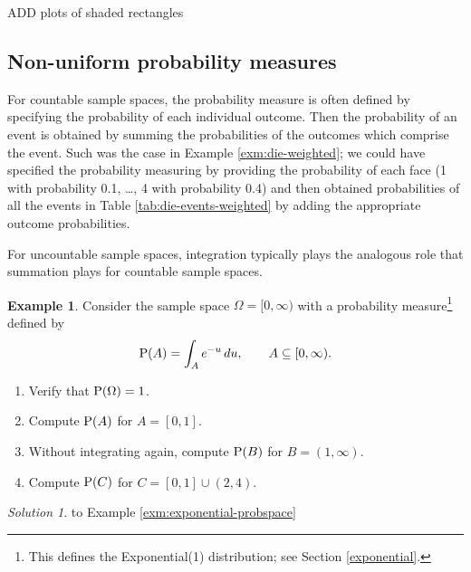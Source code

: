 \documentclass[
]{book}
\providecommand{\tightlist}{%
  \setlength{\itemsep}{0pt}\setlength{\parskip}{0pt}}
\theoremstyle{definition}
\theoremstyle{definition}
\newtheorem{example}{Example}[chapter]
\theoremstyle{definition}
\theoremstyle{remark}
\newtheorem*{solution}{Solution}
\begin{document}
ADD plots of shaded rectangles

\hypertarget{non-uniform-probability-measures}{%
\subsection{Non-uniform probability measures}\label{non-uniform-probability-measures}}

For countable sample spaces, the probability measure is often defined by specifying the probability of each individual outcome. Then the probability of an event is obtained by summing the probabilities of the outcomes which comprise the event. Such was the case in Example \ref{exm:die-weighted}; we could have specified the probability measuring by providing the probability of each face (1 with probability 0.1, \ldots, 4 with probability 0.4) and then obtained probabilities of all the events in Table \ref{tab:die-events-weighted} by adding the appropriate outcome probabilities.

For uncountable sample spaces, integration typically plays the analogous role that summation plays for countable sample spaces.

\begin{example}
\protect\hypertarget{exm:exponential-probspace}{}{\label{exm:exponential-probspace} }Consider the sample space \(\Omega=[0,\infty)\) with a probability measure\footnote{This defines the Exponential(1) distribution; see Section \ref{exponential}.} defined by
\[
  \textrm{P}(A) = \int_A e^{-u}\, du, \qquad A \subseteq [0, \infty).
\]
\end{example}

\begin{enumerate}
\def\labelenumi{\arabic{enumi}.}
\tightlist
\item
  Verify that \(\textrm{P}(\Omega)=1\).
\item
  Compute \(\textrm{P}(A)\) for \(A=[0, 1]\).
\item
  Without integrating again, compute \(\textrm{P}(B)\) for \(B=(1, \infty)\).
\item
  Compute \(\textrm{P}(C)\) for \(C=[0, 1] \cup (2, 4)\).
\end{enumerate}

\begin{solution}
{}to Example \ref{exm:exponential-probspace}
\end{solution}

  
\end{document}
